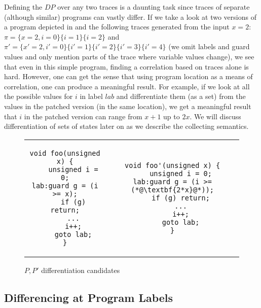 Defining the $DP$ over any two traces is a daunting task since traces of separate (although similar) programs can vastly differ. If we take a look at two versions of a program depicted in  and the following traces generated from the input $x=2$: $\pi = \{x=2,i=0 \}\{i=1 \}\{i=2 \}$ and $\pi' = \{ x'=2,i'=0 \}\{ i'=1 \}\{ i'=2 \}\{ i'=3 \}\{i'=4\}$ (we omit labels and guard values and only mention parts of the trace where variable values change), we see that even in this simple program, finding a correlation based on traces alone is hard. However, one can get the sense that using program location as a means of correlation, one can produce a meaningful result. For example, if we look at all the possible values for $i$ in label $lab$ and differentiate them (as a set) from the values in the patched version (in the same location), we get a meaningful result that $i$ in the patched version can range from $x+1$ up to $2x$. We will discuss differentiation of sets of states later on as we describe the collecting semantics.

\begin{figure}
\begin{tabular}{cc}
\centering
\begin{lstlisting}
void foo(unsigned x) {
    unsigned i = 0;
lab:guard g = (i >= x);
    if (g) return;
    ...
    i++;
    goto lab;
}
\end{lstlisting}
&
\begin{lstlisting}
void foo'(unsigned x) {
    unsigned i = 0;
lab:guard g = (i >= (*@\textbf{2*x}@*));
    if (g) return;
    ...
    i++;
    goto lab;
}
\end{lstlisting}
\end{tabular}
\caption{$P,P'$ differentiation candidates}
\end{figure}

\subsection{Differencing at Program Labels} 

